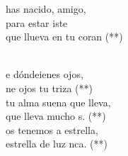 \begin{cancion}%
	\begin{chorus}%
	has nacido, amigo,\\
	para estar iste\\
	que llueva en tu coran (**)\\
	\end{chorus}%
	\jump\\
	e dóndeienes ojos,\\
	ne ojos tu triza (**)\\
\jump
	tu alma suena  que lleva,\\
	que lleva mucho s. (**)\\
\jump
	os tenemos a estrella,\\
	 estrella de luz nca. (**)\\
\end{cancion}%
